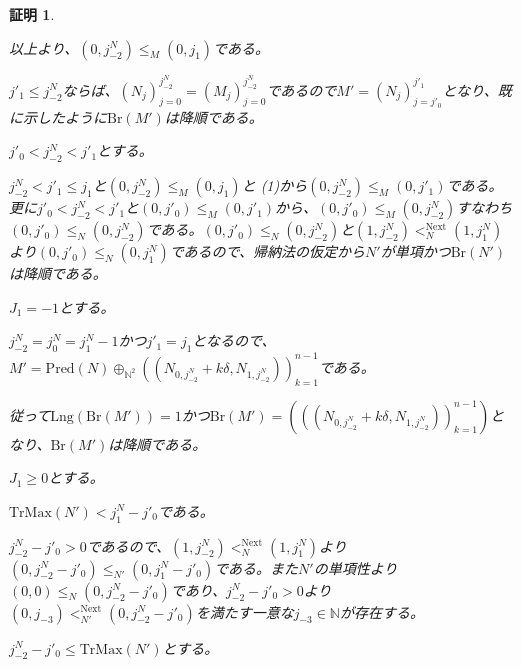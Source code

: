 \documentclass[dvipdfmx,uplatex]{jsarticle}
\theoremstyle{customnonumberbreakfortheorem}
\theoremstyle{customnonumberbreakforproof}
\newtheorem{hideableproof}{証明}
\begin{document}
\begin{hideableproof}
\begin{indented}
\begin{indented}
\begin{indented}
\begin{indented}
\begin{indented}
					\end{indented}
					\item 以上より、\((0,j_{-2}^N) \leq_M (0,j_1)\)である。
					\item
					\item \(j'_1 \leq j_{-2}^N\)ならば、\((N_j)_{j=0}^{j_{-2}^N} = (M_j)_{j=0}^{j_{-2}^N}\)であるので\(M' = (N_j)_{j=j'_0}^{j'_1}\)となり、既に示したように\(\textrm{Br}(M')\)は降順である。
					\item \(j'_0 < j_{-2}^N < j'_1\)とする。
					\begin{indented}
						\item \(j_{-2}^N < j'_1 \leq j_1\)と\((0,j_{-2}^N) \leq_M (0,j_1)\)と (1)から\((0,j_{-2}^N) \leq_M (0,j'_1)\)である。更に\(j'_0 < j_{-2}^N < j'_1\)と\((0,j'_0) \leq_M (0,j'_1)\)から、\((0,j'_0) \leq_M (0,j_{-2}^N)\)すなわち\((0,j'_0) \leq_N (0,j_{-2}^N)\)である。\((0,j'_0) \leq_N (0,j_{-2}^N)\)と\((1,j_{-2}^N) <_N^{\textrm{Next}} (1,j_1^N)\)より\((0,j'_0) \leq_N (0,j_1^N)\)であるので、帰納法の仮定から\(N'\)が単項かつ\(\textrm{Br}(N')\)は降順である。
						\item
						\item \(J_1 = -1\)とする。
						\begin{indented}
							\item \(j_{-2}^N = j_0^N = j_1^N-1\)かつ\(j'_1 = j_1\)となるので、\(M' = \textrm{Pred}(N) \oplus_{\mathbb{N}^2} ((N_{0,j_{-2}^N}+k \delta,N_{1,j_{-2}^N}))_{k=1}^{n-1}\)である。
							\item 従って\(\textrm{Lng}(\textrm{Br}(M')) = 1\)かつ\(\textrm{Br}(M') = (((N_{0,j_{-2}^N}+k \delta,N_{1,j_{-2}^N}))_{k=1}^{n-1})\)となり、\(\textrm{Br}(M')\)は降順である。
						\end{indented}
						\item
						\item \(J_1 \geq 0\)とする。
						\begin{indented}
							\item \(\textrm{TrMax}(N') < j_1^N-j'_0\)である。
							\item \(j_{-2}^N-j'_0 > 0\)であるので、\((1,j_{-2}^N) <_N^{\textrm{Next}} (1,j_1^N)\)より\((0,j_{-2}^N-j'_0) \leq_{N'} (0,j_1^N-j'_0)\)である。また\(N'\)の単項性より\((0,0) \leq_N (0,j_{-2}^N-j'_0)\)であり、\(j_{-2}^N-j'_0 > 0\)より\((0,j_{-3}) <_{N'}^{\textrm{Next}} (0,j_{-2}^N-j'_0)\)を満たす一意な\(j_{-3} \in \mathbb{N}\)が存在する。
							\item
							\item \(j_{-2}^N-j'_0 \leq \textrm{TrMax}(N')\)とする。

\end{indented}
\end{indented}
\end{indented}
\end{indented}
\end{indented}
\end{indented}
\end{hideableproof}
\end{document}
